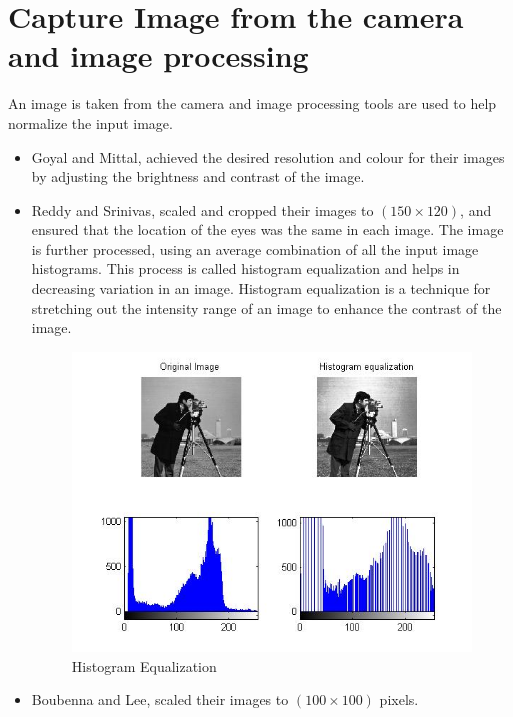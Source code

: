 \section{Capture Image from the camera and image processing}
An image is taken from the camera and image processing tools are used to help normalize the input image.
\begin{itemize}

\item Goyal and Mittal, achieved the desired resolution and colour for their images by adjusting the brightness and contrast of the image\cite{1}.
\item Reddy and Srinivas, scaled and cropped their images to $(150 \times 120)$, and ensured that the location of the eyes was the same in each image. The image is further processed, using an average combination of all the input image histograms. This process is called histogram equalization and helps in decreasing variation in an image. Histogram equalization is a technique for stretching out the intensity range of an image to enhance the contrast of the image\cite{2}.

\begin{figure}[ht]
  \centering
  \includegraphics[scale=0.4]{5}
  \caption{Histogram Equalization}
\end{figure}

\item Boubenna and Lee, scaled their images to $(100 \times 100)$ pixels\cite{3}.

\end{itemize}
